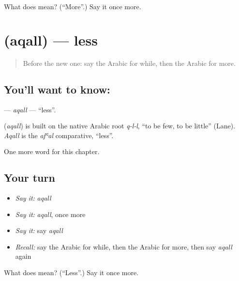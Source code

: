 \begin{tcolorbox}[breakable,colback=teal!4,colframe=teal!35!black,title={Before you move on}]
What does  mean? (\textquotedblleft{}More\textquotedblright{}.) Say it once more.
\end{tcolorbox}
\section[\texorpdfstring{\ar{أقل} (aqall)}{أقل (aqall)}]{ (aqall) — less}

\label{lesson:AR-C176-aqall}



\begin{quote}
Before the new one: say the Arabic for while, then the Arabic for more.
\end{quote}

\subsection*{You'll want to know: }
\textbf{} — \emph{aqall} — \textquotedblleft{}less\textquotedblright{}.

\begin{cousinweb}
\textbf{} (\emph{aqall}) is built on the native Arabic root \emph{q-l-l}, \textquotedblleft{}to be few, to be little\textquotedblright{} (Lane). \emph{Aqall} is the \emph{afʿal} comparative, \textquotedblleft{}less\textquotedblright{}.
\end{cousinweb}

\begin{grammarlens}[title={What you've built}]
One more word for this chapter.
\end{grammarlens}

\subsection*{Your turn}
\begin{itemize}
\raggedright
  \item \emph{Say it:} \emph{aqall}
  \item \emph{Say it:} \emph{aqall}, once more
  \item \emph{Say it:} say \emph{aqall}
  \item \emph{Recall:} say the Arabic for while, then the Arabic for more, then say \emph{aqall} again
\end{itemize}

\begin{tcolorbox}[breakable,colback=teal!4,colframe=teal!35!black,title={Before you move on}]
What does  mean? (\textquotedblleft{}Less\textquotedblright{}.) Say it once more.
\end{tcolorbox}
